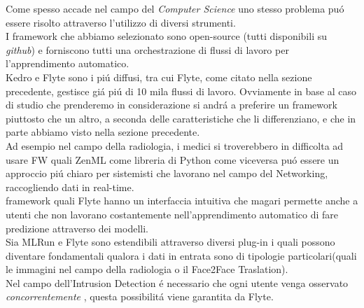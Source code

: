 \documentclass[../tesi.tex]{subfiles}
\begin{document}
Come spesso accade nel campo del \textit{Computer Science} uno stesso problema puó essere risolto attraverso l'utilizzo di diversi strumenti.\\
I framework che abbiamo selezionato sono open-source (tutti disponibili su \textit{github}) e forniscono tutti una  orchestrazione di flussi di lavoro per l'apprendimento automatico.\\
Kedro e Flyte sono i piú diffusi, tra cui Flyte, come citato nella sezione precedente, gestisce giá piú di 10 mila flussi di lavoro.
Ovviamente in base al caso di studio che prenderemo in considerazione si andrá a preferire un \Gls{framework} piuttosto che un altro, a seconda delle caratteristiche che li differenziano, e che in parte abbiamo visto nella sezione precedente.\\
Ad esempio nel campo della radiologia, i medici si troverebbero in difficolta ad usare FW quali ZenML come libreria di Python come viceversa puó essere un approccio piú chiaro per sistemisti che lavorano nel campo del Networking, raccogliendo dati in real-time.\\
\Gls{framework} quali Flyte hanno un interfaccia intuitiva che magari permette anche a utenti che non lavorano costantemente nell'apprendimento automatico di fare predizione attraverso dei modelli.\\
Sia MLRun e Flyte sono estendibili attraverso diversi plug-in i quali possono diventare fondamentali qualora i dati in entrata sono di tipologie particolari(quali le immagini nel campo della radiologia o il Face2Face Traslation).\\
Nel campo dell'Intrusion Detection é necessario che ogni utente venga osservato \textit{concorrentemente} , questa possibilitá viene garantita da Flyte.
\end{document}
